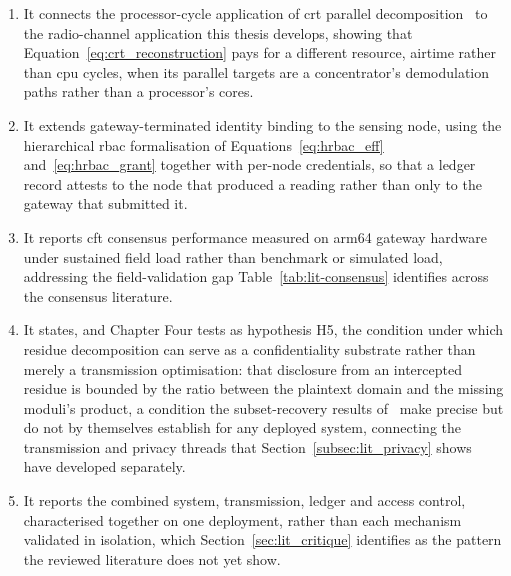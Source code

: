 \documentclass[12pt,a4paper,oneside]{book}
\begin{document}
\begin{enumerate}
  \item It connects the processor-cycle application of \gls{crt} parallel
        decomposition~\cite{beloa2025bitcoincrt} to the radio-channel
        application this thesis develops, showing that
        Equation~\ref{eq:crt_reconstruction} pays for a different resource,
        airtime rather than \gls{cpu} cycles, when its parallel targets are
        a concentrator's demodulation paths rather than a processor's
        cores.
  \item It extends gateway-terminated identity binding to the sensing
        node, using the hierarchical \gls{rbac} formalisation of
        Equations~\ref{eq:hrbac_eff} and~\ref{eq:hrbac_grant}
        \cite{beloasone2025hrbac} together with per-node credentials, so
        that a ledger record attests to the node that produced a reading
        rather than only to the gateway that submitted it.
  \item It reports \gls{cft} consensus performance measured on \gls{arm64}
        gateway hardware under sustained field load rather than benchmark
        or simulated load, addressing the field-validation gap
        Table~\ref{tab:lit-consensus} identifies across the consensus
        literature.
  \item It states, and Chapter Four tests as hypothesis H5, the condition
        under which residue decomposition can serve as a confidentiality
        substrate rather than merely a transmission optimisation: that
        disclosure from an intercepted residue is bounded by the ratio
        between the plaintext domain and the missing moduli's product, a
        condition the subset-recovery results
        of~\cite{goldreich1999china,shoup2009computational} make precise
        but do not by themselves establish for any deployed system,
        connecting the transmission and privacy threads that
        Section~\ref{subsec:lit_privacy} shows have developed
        separately.
  \item It reports the combined system, transmission, ledger and access
        control, characterised together on one deployment, rather than
        each mechanism validated in isolation, which
        Section~\ref{sec:lit_critique} identifies as the pattern the
        reviewed literature does not yet show.
\end{enumerate}
\clearpage{}


\backmatter

\begin{singlespace}
\printbibliography[heading=none]
\end{singlespace}
\end{document}
